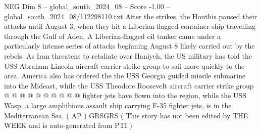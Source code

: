 \begin{textsample}{NEG Dim 8 – global\_south\_2024\_08 – Score -1.00 – global\_south\_2024\_08/112298110.txt}
After the strikes, the Houthis paused their attacks until August 3, when they hit a Liberian-flagged container ship travelling through the Gulf of Aden.
A Liberian-flagged oil tanker came under a particularly intense series of attacks beginning August 8 likely carried out by the rebels.
As Iran threatens to retaliate over Haniyeh, the US military has told the USS Abraham Lincoln aircraft carrier strike group to sail more quickly to the area.
America also has ordered the the USS Georgia guided missile submarine into the Mideast, while the USS Theodore Roosevelt aircraft carrier strike group @ @ @ @ @ @ @ @ @ @ fighter jets have flown into the region, while the USS Wasp, a large amphibious assault ship carrying F-35 fighter jets, is in the Mediterranean Sea. ( AP ) GRSGRS ( This story has not been edited by THE WEEK and is auto-generated from PTI )

\end{textsample}
